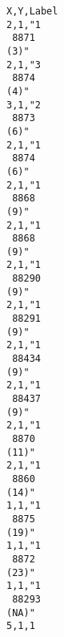 \begin{verbatim}
X,Y,Label
2,1,"1 
 8871
(3)"
2,1,"3 
 8874
(4)"
3,1,"2 
 8873
(6)"
2,1,"1 
 8874
(6)"
2,1,"1 
 8868
(9)"
2,1,"1 
 8868
(9)"
2,1,"1 
 88290
(9)"
2,1,"1 
 88291
(9)"
2,1,"1 
 88434
(9)"
2,1,"1 
 88437
(9)"
2,1,"1 
 8870
(11)"
2,1,"1 
 8860
(14)"
1,1,"1 
 8875
(19)"
1,1,"1 
 8872
(23)"
1,1,"1 
 88293
(NA)"
5,1,1
\end{verbatim}
